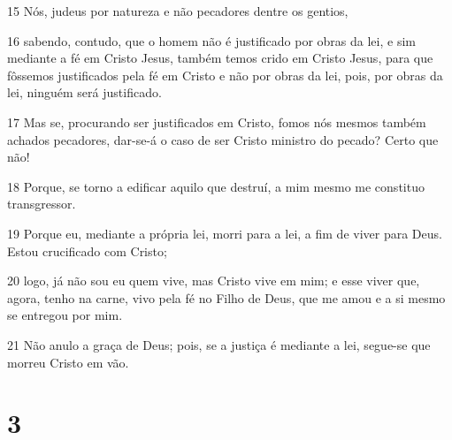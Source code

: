 \par 15 Nós, judeus por natureza e não pecadores dentre os gentios,
\par 16 sabendo, contudo, que o homem não é justificado por obras da lei, e sim mediante a fé em Cristo Jesus, também temos crido em Cristo Jesus, para que fôssemos justificados pela fé em Cristo e não por obras da lei, pois, por obras da lei, ninguém será justificado.
\par 17 Mas se, procurando ser justificados em Cristo, fomos nós mesmos também achados pecadores, dar-se-á o caso de ser Cristo ministro do pecado? Certo que não!
\par 18 Porque, se torno a edificar aquilo que destruí, a mim mesmo me constituo transgressor.
\par 19 Porque eu, mediante a própria lei, morri para a lei, a fim de viver para Deus. Estou crucificado com Cristo;
\par 20 logo, já não sou eu quem vive, mas Cristo vive em mim; e esse viver que, agora, tenho na carne, vivo pela fé no Filho de Deus, que me amou e a si mesmo se entregou por mim.
\par 21 Não anulo a graça de Deus; pois, se a justiça é mediante a lei, segue-se que morreu Cristo em vão.

\chapter{3}

